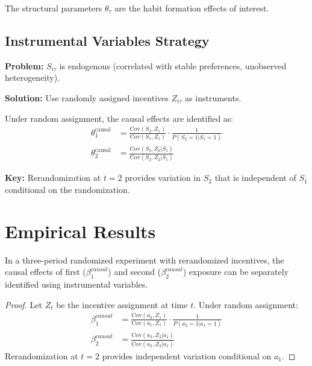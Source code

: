The structural parameters $\theta_\tau$ are the habit formation effects of interest.

\subsection{Instrumental Variables Strategy}

\textbf{Problem:} $S_{i\tau}$ is endogenous (correlated with stable preferences, unobserved heterogeneity).

\textbf{Solution:} Use randomly assigned incentives $Z_{i\tau}$ as instruments.

\begin{tcolorbox}[colback=gray!5!white, colframe=gray!75!black,
    title=IV Identification]
Under random assignment, the causal effects are identified as:
\begin{align}
\theta_1^{\text{causal}} &= \frac{\text{Cov}(S_3, Z_1)}{\text{Cov}(S_1, Z_1)} \cdot \frac{1}{P(S_2 = 1 | S_1 = 1)} \\[0.5em]
\theta_2^{\text{causal}} &= \frac{\text{Cov}(S_3, Z_2 | S_1)}{\text{Cov}(S_2, Z_2 | S_1)}
\end{align}

\textbf{Key:} Rerandomization at $t=2$ provides variation in $S_2$ that is independent of $S_1$
conditional on the randomization.
\end{tcolorbox}


\section{Empirical Results}
\label{sec:hf-results}

\begin{proposition}
In a three-period randomized experiment with rerandomized incentives, the causal effects
of first ($\beta^{causal}_1$) and second ($\beta^{causal}_2$) exposure can be separately identified
using instrumental variables.
\end{proposition}

\begin{proof}
Let $Z_t$ be the incentive assignment at time $t$. Under random assignment:
\begin{align}
\beta^{causal}_1 &= \frac{\text{Cov}(a_3, Z_1)}{\text{Cov}(a_1, Z_1)} \cdot \frac{1}{P(a_2 = 1 | a_1 = 1)} \\
\beta^{causal}_2 &= \frac{\text{Cov}(a_3, Z_2 | a_1)}{\text{Cov}(a_2, Z_2 | a_1)}
\end{align}
Rerandomization at $t=2$ provides independent variation conditional on $a_1$.
\end{proof}

